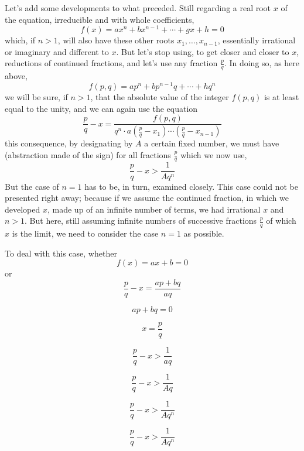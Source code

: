 \documentclass{article}
\begin{document}
Let’s add some developments to what preceded. Still regarding a real root $x$ of
the equation, irreducible and with whole coefficients,
  $$f(x)=ax^n + bx^{n-1} + \cdots + gx + h = 0$$
which, if $n>1$, will also have these other roots $x_1, \ldots, x_{n-1}$,
essentially irrational or imaginary and different to $x$. But let’s stop using,
to get closer and closer to $x$, reductions of continued fractions, and let’s
use any fraction $\frac{p}{q}$. In doing so, as here above,
  $$f(p,q) = ap^n + bp^{n-1} q + \cdots + hq^n$$
we will be sure, if $n>1$, that the absolute value of the integer $f(p,q)$ is
at least equal to the unity, and we can again use the equation
  $$\frac{p}{q} - x = \frac{f(p, q)}{q^n\cdot a\left(\frac{p}{q} - x_1\right)
  \cdots\left(\frac{p}{q}- x_{n-1}\right)}$$
this consequence, by designating by $A$ a certain fixed number, we must have
(abstraction made of the sign) for all fractions $\frac{p}{q}$ which we now use,
  $$\frac{p}{q} - x > \frac{1}{Aq^n}$$
But the case of $n=1$ has to be, in turn, examined closely. This case could not
be presented right away; because if we assume the continued fraction, in which
we developed $x$, made up of an infinite number of terms, we had irrational $x$
and $n > 1$. But here, still assuming infinite numbers of successive fractions
$\frac{p}{q}$ of which $x$ is the limit, we need to consider the case $n = 1$
as possible.

To deal with this case, whether
  $$f(x) = ax + b = 0$$
or
  $$\frac{p}{q} - x = \frac{ap + bq}{aq}$$
\newpage

\begin{equation}
  ap + bq = 0
\end{equation}

\begin{equation}
  x = \frac{p}{q}
\end{equation}

\begin{equation}
  \frac{p}{q} - x > \frac{1}{aq}
\end{equation}

\begin{equation}
  \frac{p}{q} - x > \frac{1}{Aq}
\end{equation}

\begin{equation}
  \frac{p}{q} - x > \frac{1}{Aq^n}
\end{equation}

\begin{equation}
  \frac{p}{q} - x > \frac{1}{Aq^n}
\end{equation}
\end{document}
